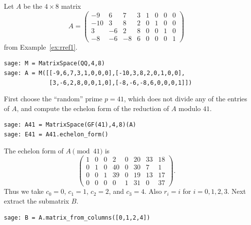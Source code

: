 \begin{example}
Let $A$ be the $4\times 8$ matrix 
$$
A =\left(\begin{array}{rrrrrrrr}
-9&6&7&3&1&0&0&0\\
-10&3&8&2&0&1&0&0\\
3&-6&2&8&0&0&1&0\\
-8&-6&-8&6&0&0&0&1
\end{array}\right)
$$
from Example~\ref{ex:rref1}.
\begin{verbatim}
sage: M = MatrixSpace(QQ,4,8)
sage: A = M([[-9,6,7,3,1,0,0,0],[-10,3,8,2,0,1,0,0],
             [3,-6,2,8,0,0,1,0],[-8,-6,-8,6,0,0,0,1]])
\end{verbatim}%

First choose the ``random'' prime $p=41$, which does not
divide any of the entries of $A$, and compute the
echelon form of the reduction of $A$ modulo $41$.
\begin{verbatim}
sage: A41 = MatrixSpace(GF(41),4,8)(A)
sage: E41 = A41.echelon_form()
\end{verbatim}%

The echelon form of $A\pmod{41}$ is 
$$
\left(\begin{array}{rrrrrrrr}
1&0&0&2&0&20&33&18\\
0&1&0&40&0&30&7&1\\
0&0&1&39&0&19&13&17\\
0&0&0&0&1&31&0&37
\end{array}\right).
$$
Thus we take $c_0=0$, $c_1=1$, $c_2=2$, and $c_3 = 4$.
Also $r_i=i$ for $i=0,1,2,3$.  
Next extract the submatrix $B$.
\begin{verbatim}
sage: B = A.matrix_from_columns([0,1,2,4])
\end{verbatim}%


\end{example}
